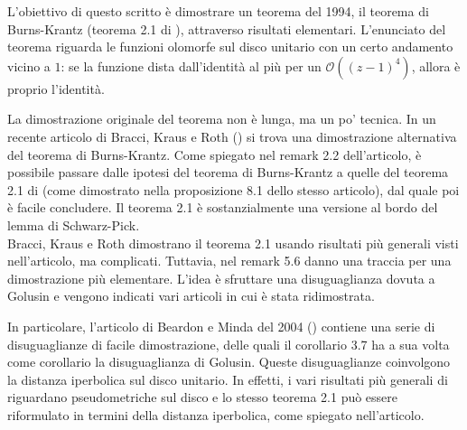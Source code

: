 L'obiettivo di questo scritto è dimostrare un teorema del 1994, il teorema di Burns-Krantz (teorema 2.1 di \cite{BK}), attraverso risultati elementari. L'enunciato del teorema riguarda le funzioni olomorfe sul disco unitario con un certo andamento vicino a $1$: se la funzione dista dall'identità al più per un $\mathcal{O}((z-1)^4)$, allora è proprio l'identità.

La dimostrazione originale del teorema non è lunga, ma un po' tecnica. In un recente articolo di Bracci, Kraus e Roth (\cite{BKR}) si trova una dimostrazione alternativa del teorema di Burns-Krantz. Come spiegato nel remark 2.2 dell'articolo, è possibile passare dalle ipotesi del teorema di Burns-Krantz a quelle del teorema 2.1 di \cite{BKR} (come dimostrato nella proposizione 8.1 dello stesso articolo), dal quale poi è facile concludere. Il teorema 2.1 è sostanzialmente una versione al bordo del lemma di Schwarz-Pick. \\

Bracci, Kraus e Roth dimostrano il teorema 2.1 usando risultati più generali visti nell'articolo, ma complicati. Tuttavia, nel remark 5.6 danno una traccia per una dimostrazione più elementare. L'idea è sfruttare una disuguaglianza dovuta a Golusin e vengono indicati vari articoli in cui è stata ridimostrata.

In particolare, l'articolo di Beardon e Minda del 2004 (\cite{BM}) contiene una serie di disuguaglianze di facile dimostrazione, delle quali il corollario 3.7 ha a sua volta come corollario la disuguaglianza di Golusin. Queste disuguaglianze coinvolgono la distanza iperbolica sul disco unitario. In effetti, i vari risultati più generali di \cite{BK} riguardano pseudometriche sul disco e lo stesso teorema 2.1 può essere riformulato in termini della distanza iperbolica, come spiegato nell'articolo.

